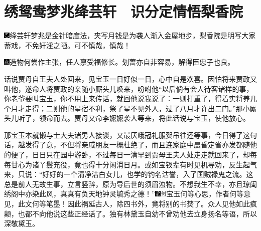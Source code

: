 

\chapter{绣鸳鸯梦兆绛芸轩　识分定情悟梨香院}

{\includegraphics[width=3mm]{../Images/00003}绛芸轩梦兆是金针暗度法，夹写月钱是为袭人渐入金屋地步，梨香院是明写大家蓄戏，不免奸淫之陋。可不慎哉，慎哉！}

{\includegraphics[width=3mm]{../Images/00005}造物何尝作主张，任人禀受福修长。划蔷亦自非容易，解得臣忠子也良。}

话说贾母自王夫人处回来，见宝玉一日好似一日，心中自是欢喜。因怕将来贾政又叫他，遂命人将贾政的亲随小厮头儿唤来，吩咐他``以后倘有会人待客诸样的事，你老爷要叫宝玉，你不用上来传话，就回他说我说了：一则打重了，得着实将养几个月才走得；二则他的星宿不利，祭了星不见外人，过了八月才许出二门。''那小厮头儿听了，领命而去。贾母又命李嬷嬷袭人等来，将此话说与宝玉，使他放心。

那宝玉本就懒与士大夫诸男人接谈，又最厌峨冠礼服贺吊往还等事，今日得了这句话，越发得了意，不但将亲戚朋友一概杜绝了，而且连家庭中晨昏定省亦发都随他的便了，日日只在园中游卧，不过每日一清早到贾母王夫人处走走就回来了，却每每甘心为诸丫鬟充役，竟也得十分闲消日月。或如宝钗辈有时见机导劝，反生起气来，只说：``好好的一个清净洁白女儿，也学的钓名沽誉，入了国贼禄鬼之流。这总是前人无故生事，立言竖辞，原为导后世的须眉浊物。不想我生不幸，亦且琼闺绣阁中亦染此风，真真有负天地钟灵毓秀之德！''{\includegraphics[width=3mm]{../Images/00006}\includegraphics[width=3mm]{../Images/00011}\footnotesize \kaishu 宝玉何等心思，作者何等意见，此文何等笔墨！}因此祸延古人，除四书外，竟将别的书焚了。众人见他如此疯颠，也都不向他说这些正经话了。独有林黛玉自幼不曾劝他去立身扬名等语，所以深敬黛玉。

